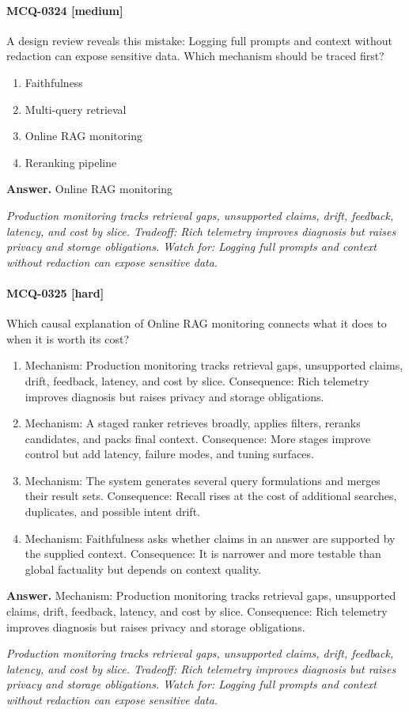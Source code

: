 \paragraph{MCQ-0324 [medium]} A design review reveals this mistake: Logging full prompts and context without redaction can expose sensitive data. Which mechanism should be traced first?
\begin{enumerate}[label=\Alph*.]
\item Faithfulness
\item Multi-query retrieval
\item Online RAG monitoring
\item Reranking pipeline
\end{enumerate}
\noindent\textbf{Answer.} Online RAG monitoring
\par\textit{Production monitoring tracks retrieval gaps, unsupported claims, drift, feedback, latency, and cost by slice. Tradeoff: Rich telemetry improves diagnosis but raises privacy and storage obligations. Watch for: Logging full prompts and context without redaction can expose sensitive data.}
\paragraph{MCQ-0325 [hard]} Which causal explanation of Online RAG monitoring connects what it does to when it is worth its cost?
\begin{enumerate}[label=\Alph*.]
\item Mechanism: Production monitoring tracks retrieval gaps, unsupported claims, drift, feedback, latency, and cost by slice. Consequence: Rich telemetry improves diagnosis but raises privacy and storage obligations.
\item Mechanism: A staged ranker retrieves broadly, applies filters, reranks candidates, and packs final context. Consequence: More stages improve control but add latency, failure modes, and tuning surfaces.
\item Mechanism: The system generates several query formulations and merges their result sets. Consequence: Recall rises at the cost of additional searches, duplicates, and possible intent drift.
\item Mechanism: Faithfulness asks whether claims in an answer are supported by the supplied context. Consequence: It is narrower and more testable than global factuality but depends on context quality.
\end{enumerate}
\noindent\textbf{Answer.} Mechanism: Production monitoring tracks retrieval gaps, unsupported claims, drift, feedback, latency, and cost by slice. Consequence: Rich telemetry improves diagnosis but raises privacy and storage obligations.
\par\textit{Production monitoring tracks retrieval gaps, unsupported claims, drift, feedback, latency, and cost by slice. Tradeoff: Rich telemetry improves diagnosis but raises privacy and storage obligations. Watch for: Logging full prompts and context without redaction can expose sensitive data.}
